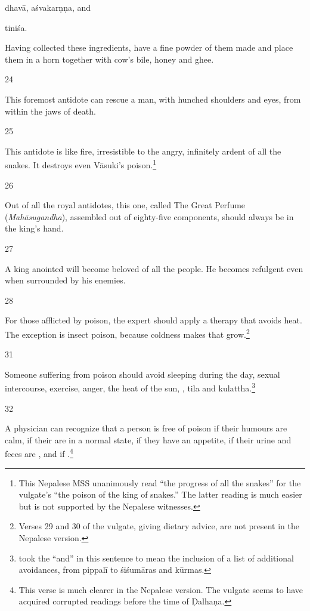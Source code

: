 \begin{translation}
\gls{dhavā},  
\gls{aśvakarṇṇa},  and 
    
\gls{tiniśa}.

Having collected these ingredients, have a fine powder of them made and 
place them in a horn together with cow's bile, honey and ghee.

\item [24]

This foremost antidote can rescue a man, with hunched shoulders and 
 eyes, from within the jaws of death.

\item [25]

This antidote is like fire, irresistible to the angry, infinitely
ardent  of all the snakes.  It destroys even Vāsuki's
poison.\footnote{This Nepalese MSS unanimously read
     “the progress of all the snakes” for the
    vulgate's  “the poison of the king of snakes.” 
    The latter reading is much easier but is not supported by the
    Nepalese witnesses.}

\item [26]

Out of all the royal antidotes, this one, called The Great Perfume
(\emph{Mahāsugandha}), assembled out of eighty-five components, 
should always be in the king's hand.

\item [27]

A king anointed  will become beloved of all the people.  He 
becomes refulgent even when surrounded by his enemies. 

\item [28]

For those afflicted by poison, the expert should apply a therapy that
avoids heat.  The exception is insect poison, because coldness
makes that grow.\footnote{Verses 29 and 30 of the vulgate, giving dietary 
advice, are not present in the Nepalese version.}

\item[31]

Someone suffering from poison should avoid 
sleeping during the day, sexual intercourse, exercise, anger, the heat of the 
sun, , \gls{tila} and 
\gls{kulattha}.\footnote{ took the “and” in this 
sentence to mean the inclusion of a list of additional avoidances, from 
\gls{pippalī} to 
\glspl{śiśumāra} and \glspl{kūrma}.}


\item[32]

A physician can recognize that a person is free of poison if their 
humours are calm, if their  are in a normal state, 
if they have an appetite, if their urine and feces are , and
if .\footnote{This 
verse is much clearer in the Nepalese version.  The vulgate seems to have 
acquired corrupted readings before the time of Ḍalhaṇa.}

\end{translation}
